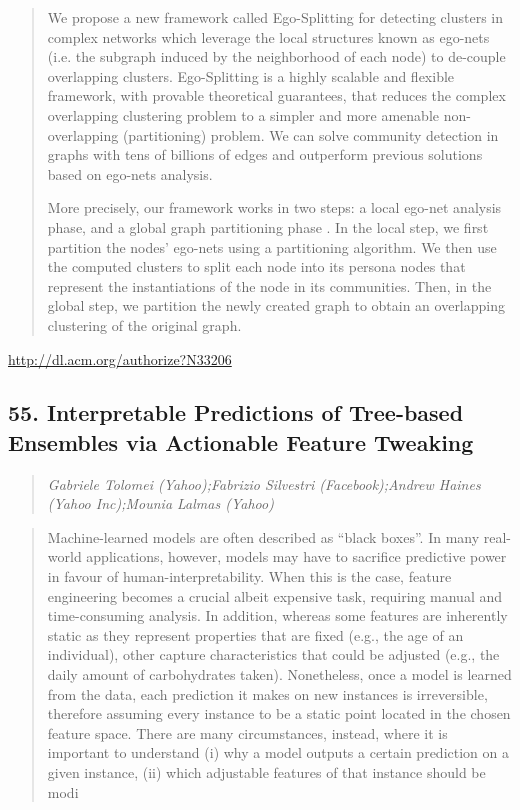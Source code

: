 \documentclass{article}
\begin{document}
\begin{quote}
We propose a new framework called Ego-Splitting for detecting clusters in complex networks which leverage the local structures known as ego-nets (i.e. the subgraph induced by the neighborhood of each node) to de-couple overlapping clusters. Ego-Splitting is a highly scalable and flexible framework, with provable theoretical guarantees, that reduces the complex overlapping clustering problem to a simpler and more amenable non-overlapping (partitioning) problem. We can solve community detection in graphs with tens of billions of edges and outperform previous solutions based on ego-nets analysis.







 More precisely, our framework works in two steps: a local ego-net analysis phase, and a global graph partitioning phase . In the local step, we first partition the nodes’ ego-nets using a partitioning algorithm. We then use the computed clusters to split each node into its persona nodes that represent the instantiations of the node in its communities. Then, in the global step, we partition the newly created graph to obtain an overlapping clustering of the original graph.
\end{quote}

\href{http://dl.acm.org/authorize?N33206}{http://dl.acm.org/authorize?N33206}

\subsection{55. Interpretable Predictions of Tree-based Ensembles via Actionable Feature Tweaking}

\begin{quote}
\footnotesize{\textit{Gabriele Tolomei (Yahoo);Fabrizio Silvestri (Facebook);Andrew Haines (Yahoo Inc);Mounia Lalmas (Yahoo)}}

\end{quote}

\begin{quote}
Machine-learned models are often described as “black boxes”. In many real-world applications, however, models may have to sacrifice predictive power in favour of human-interpretability. When this is the case, feature engineering becomes a crucial albeit expensive task, requiring manual and time-consuming analysis. In addition, whereas some features are inherently static as they represent properties that are fixed (e.g., the age of an individual), other capture characteristics that could be adjusted (e.g., the daily amount of carbohydrates taken). Nonetheless, once a model is learned from the data, each prediction it makes on new instances is irreversible, therefore assuming every instance to be a static point located in the chosen feature space. There are many circumstances, instead, where it is important to understand (i) why a model outputs a certain prediction on a given instance, (ii) which adjustable features of that instance should be modi
\end{quote}
\end{document}
